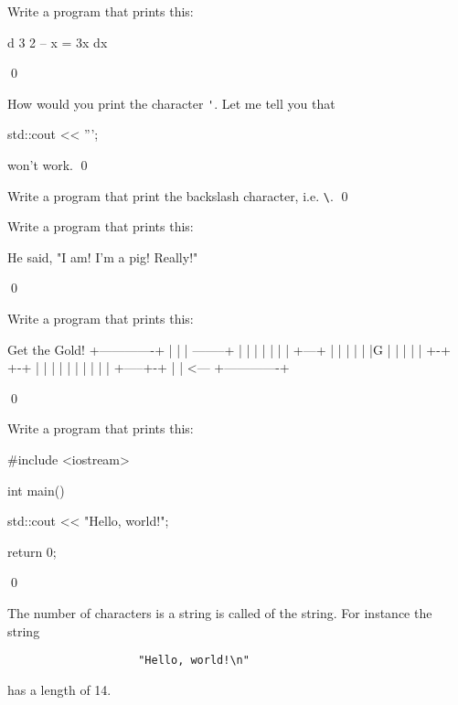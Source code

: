 \begin{ex}
Write a program that prints this:
\begin{console}
 d  3     2
-- x  = 3x
dx
\end{console}
\qed
\end{ex}

\begin{ex}
How would you print the character \verb!'!. Let me tell you that
\begin{console}
std::cout << ''';
\end{console}
won't work.
\qed
\end{ex}


\begin{ex}
Write a program that print the backslash character, i.e. \verb!\!.
\qed
\end{ex}
\begin{ex}
Write a program that prints this:
\begin{console}
He said, "I am! I'm a pig! Really!"
\end{console}
\qed
\end{ex}


\begin{ex}
Write a program that prints this:
\begin{console}
Get the Gold!
+-------------+
|             |
| --------+ | |  
|         | | |
| +---+ | | | |
| |G  | | |   |
| +-+ +-+ | | |
| | |       | |
| | +-----+-+ |
|               <---
+-------------+
\end{console}
\qed
\end{ex}

\begin{ex}
Write a program that prints this:
\begin{console}
#include <iostream>

int main()
{
    std::cout << "Hello, world!\n";

    return 0;
}
\end{console}
\qed
\end{ex}


The number of characters is a string is called 
of the string. For instance the string 
\begin{verbatim}
                    "Hello, world!\n"
\end{verbatim}
has a length of 14. 

